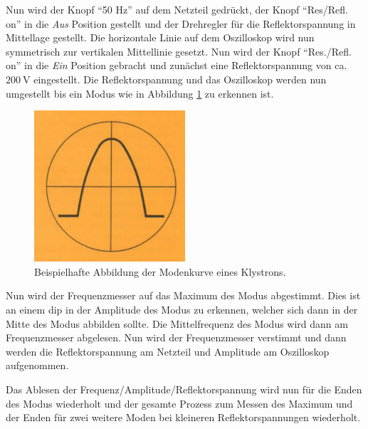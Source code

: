             Nun wird der Knopf \enquote{50 Hz} auf dem Netzteil gedrückt, der Knopf \enquote{Res/Refl. on} in die \textit{Aus} Position gestellt und der Drehregler für die Reflektorspannung in Mittellage gestellt.
            Die horizontale Linie auf dem Oszilloskop wird nun symmetrisch zur vertikalen Mittellinie gesetzt.
            Nun wird der Knopf \enquote{Res./Refl. on} in die \textit{Ein} Position gebracht und zunächst eine Reflektorspannung von ca. $\SI{200}{\volt}$ eingestellt.
            Die Reflektorspannung und das Oszilloskop werden nun umgestellt bis ein Modus wie in Abbildung \ref{fig:6} zu erkennen ist.

            \begin{figure}[H]
                \centering
                \includegraphics[width=0.5\textwidth]{pics/modus.png}
                \caption{Beispielhafte Abbildung der Modenkurve eines Klystrons.\cite{Mikro}}
                \label{fig:6}
            \end{figure}

            Nun wird der Frequenzmesser auf das Maximum des Modus abgestimmt.
            Dies ist an einem dip in der Amplitude des Modus zu erkennen, welcher sich dann in der Mitte des Modus abbilden sollte.
            Die Mittelfrequenz des Modus wird dann am Frequenzmesser abgelesen.
            Nun wird der Frequenzmesser verstimmt und dann werden die Reflektorspannung am Netzteil und Amplitude am Oszilloskop aufgenommen.
            
            Das Ablesen der Frequenz/Amplitude/Reflektorspannung wird nun für die Enden des Modus wiederholt und der gesamte Prozess zum Messen des Maximum und der Enden für zwei weitere Moden bei kleineren Reflektorspannungen wiederholt.

